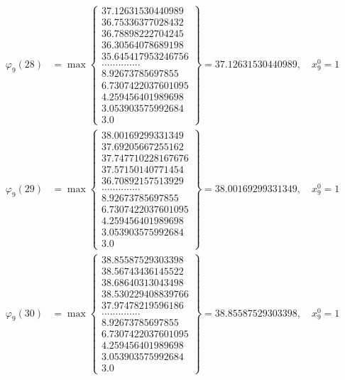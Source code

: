 \documentclass{article}
\begin{document}
\begin{align*}
  
  
  
\varphi_{9}(28) &= \max \left\{ \begin{array}{c}
37.12631530440989 \\
 36.75336377028432 \\
 36.78898222704245 \\
 36.30564078689198 \\
 35.645417953246756 \\
 .............. \\
 8.92673785697855 \\
 6.7307422037601095 \\
 4.259456401989698 \\
 3.053903575992684 \\
 3.0
\end{array} \right\} = 37.12631530440989, \quad x_{9}^0 = 1\\
  
  
  
  
\varphi_{9}(29) &= \max \left\{ \begin{array}{c}
38.00169299331349 \\
 37.69205667255162 \\
 37.747710228167676 \\
 37.57150140771454 \\
 36.70892157513929 \\
 .............. \\
 8.92673785697855 \\
 6.7307422037601095 \\
 4.259456401989698 \\
 3.053903575992684 \\
 3.0
\end{array} \right\} = 38.00169299331349, \quad x_{9}^0 = 1\\
  
  
  
  
\varphi_{9}(30) &= \max \left\{ \begin{array}{c}
38.85587529303398 \\
 38.56743436145522 \\
 38.68640313043498 \\
 38.530229408839766 \\
 37.97478219596186 \\
 .............. \\
 8.92673785697855 \\
 6.7307422037601095 \\
 4.259456401989698 \\
 3.053903575992684 \\
 3.0
\end{array} \right\} = 38.85587529303398, \quad x_{9}^0 = 1\\
  

\end{align*}
\end{document}
